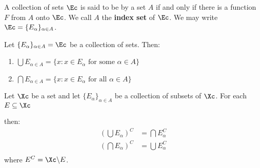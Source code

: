 \begin{definition}
 A collection of sets $\Ec$ is said to be  by a set $A$ if and only if there is a function  $F$ from  $A$ onto 
 $\Ec$. We call $A$ the \textbf{index set} of $\Ec$. We may write $\Ec=\{E_{\alpha}\}_{\alpha \in A}$.
\end{definition}

\begin{definition}
    Let $\{E_{\alpha}\}_{\alpha \in A}=\Ec$ be a collection of sets. Then:
    \begin{enumerate}[label=(\arabic*)]
        \item $\bigcup E_{\alpha \in A} = \{x: x \in E_{\alpha} \text{ for some } \alpha \in A\}$

        \item $\bigcap E_{\alpha \in A} = \{x: x \in E_{\alpha} \text{ for all } \alpha \in A\}$
    \end{enumerate}
\end{definition}

\begin{theorem}
    Let $\Xc$ be a set  and let  $\{E_{\alpha}\}_{\alpha \in A}$ be a collection of subsets of  $\Xc$. For each  $E \subseteq \Xc$ 

    then:
     \begin{align}
         (\bigcup E_{\alpha})^{C} &= \bigcap E_{\alpha}^{C} \\

         (\bigcap E_{\alpha})^{C} &= \bigcup E_{\alpha}^{C} \\

    \end{align}
    where $E^{C}=\Xc \backslash E$.
\end{theorem}


